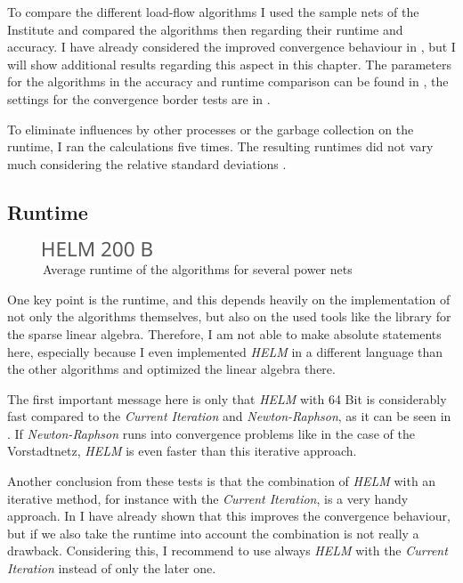 To compare the different load-flow algorithms I used the sample nets of the Institute and compared the algorithms then regarding their runtime and accuracy. I have already considered the improved convergence behaviour in , but I will show additional results regarding this aspect in this chapter. The parameters for the algorithms in the accuracy and runtime comparison can be found in , the settings for the convergence border tests are in .

To eliminate influences by other processes or the garbage collection on the runtime, I ran the calculations five times. The resulting runtimes did not vary much considering the relative standard deviations .

\subsection{Runtime}

\begin{figure}
	\centering
	\includegraphics[scale=0.7]{figures/comparison_runtime}
	\caption[Comparison, average runtime]{Average runtime of the algorithms for several power nets}
	\label{fig:comparison_runtime}
\end{figure}

One key point is the runtime, and this depends heavily on the implementation of not only the algorithms themselves, but also on the used tools like the library for the sparse linear algebra. Therefore, I am not able to make absolute statements here, especially because I even implemented \emph{HELM} in a different language than the other algorithms and optimized the linear algebra there.

The first important message here is only that \emph{HELM} with 64 Bit is considerably fast compared to the \emph{Current Iteration} and \emph{Newton-Raphson}, as it can be seen in . If \emph{Newton-Raphson} runs into convergence problems like in the case of the Vorstadtnetz, \emph{HELM} is even faster than this iterative approach. 

Another conclusion from these tests is that the combination of \emph{HELM} with an iterative method, for instance with the \emph{Current Iteration}, is a very handy approach. In  I have already shown that this improves the convergence behaviour, but if we also take the runtime into account the combination is not really a drawback. Considering this, I recommend to use always \emph{HELM} with the \emph{Current Iteration} instead of only the later one.

